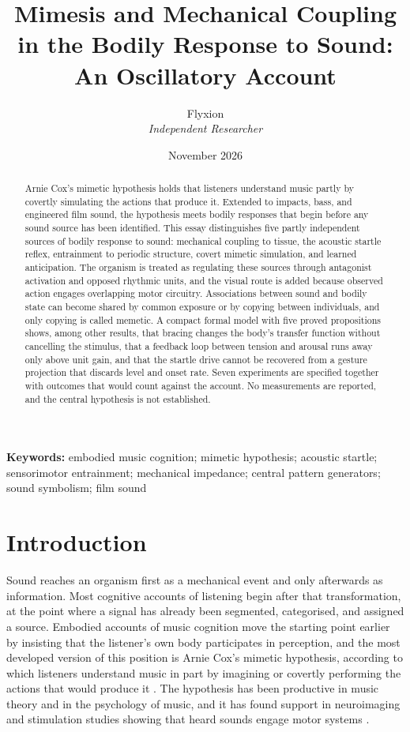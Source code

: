 \documentclass[11pt]{article}
\title{Mimesis and Mechanical Coupling in the Bodily Response to Sound:\\ An Oscillatory Account}
\author{Flyxion\\ \textit{Independent Researcher}}
\date{November 2026}
\theoremstyle{plain}
\theoremstyle{definition}
\begin{document}
\maketitle
\thispagestyle{empty}

\begin{abstract}
\noindent
Arnie Cox's mimetic hypothesis holds that listeners understand music partly by covertly simulating the actions that produce it. Extended to impacts, bass, and engineered film sound, the hypothesis meets bodily responses that begin before any sound source has been identified. This essay distinguishes five partly independent sources of bodily response to sound: mechanical coupling to tissue, the acoustic startle reflex, entrainment to periodic structure, covert mimetic simulation, and learned anticipation. The organism is treated as regulating these sources through antagonist activation and opposed rhythmic units, and the visual route is added because observed action engages overlapping motor circuitry. Associations between sound and bodily state can become shared by common exposure or by copying between individuals, and only copying is called memetic. A compact formal model with five proved propositions shows, among other results, that bracing changes the body's transfer function without cancelling the stimulus, that a feedback loop between tension and arousal runs away only above unit gain, and that the startle drive cannot be recovered from a gesture projection that discards level and onset rate. Seven experiments are specified together with outcomes that would count against the account. No measurements are reported, and the central hypothesis is not established.
\end{abstract}

\vspace{2.2em}
\noindent\textbf{Keywords:} embodied music cognition; mimetic hypothesis; acoustic startle; sensorimotor entrainment; mechanical impedance; central pattern generators; sound symbolism; film sound

\clearpage
\setcounter{page}{1}

\section{Introduction}\label{sec:intro}

Sound reaches an organism first as a mechanical event and only afterwards as information. Most cognitive accounts of listening begin after that transformation, at the point where a signal has already been segmented, categorised, and assigned a source. Embodied accounts of music cognition move the starting point earlier by insisting that the listener's own body participates in perception, and the most developed version of this position is Arnie Cox's mimetic hypothesis, according to which listeners understand music in part by imagining or covertly performing the actions that would produce it \citep{cox2001,cox2016}. The hypothesis has been productive in music theory and in the psychology of music, and it has found support in neuroimaging and stimulation studies showing that heard sounds engage motor systems \citep{gazzola2006,fadiga2002,zatorre2007}.
\end{document}
